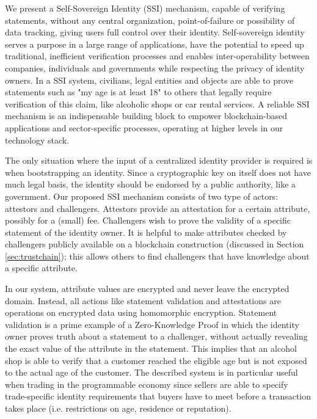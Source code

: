 \documentclass[USenglish]{article}
\begin{document}
We present a Self-Sovereign Identity (SSI) mechanism, capable of verifying statements, without any central organization, point-of-failure or possibility of data tracking, giving users full control over their identity.
Self-sovereign identity serves a purpose in a large range of applications, have the potential to speed up traditional, inefficient verification processes and enables inter-operability between companies, individuals and governments while respecting the privacy of identity owners.
In a SSI system, civilians, legal entities and objects are able to prove statements such as "my age is at least 18" to others that legally require verification of this claim, like alcoholic shops or car rental services.
A reliable SSI mechanism is an indispensable building block to empower blockchain-based applications and sector-specific processes, operating at higher levels in our technology stack.

The only situation where the input of a centralized identity provider is required is when bootstrapping an identity.
Since a cryptographic key on itself does not have much legal basis, the identity should be endorsed by a public authority, like a government.
Our proposed SSI mechanism consists of two type of actors: attestors and challengers.
Attestors provide an attestation for a certain attribute, possibly for a (small) fee.
Challengers wish to prove the validity of a specific statement of the identity owner.
It is helpful to make attributes checked by challengers publicly available on a blockchain construction (discussed in Section \ref{sec:trustchain}); this allows others to find challengers that have knowledge about a specific attribute.

In our system, attribute values are encrypted and never leave the encrypted domain.
Instead, all actions like statement validation and attestations are operations on encrypted data using homomorphic encryption.
Statement validation is a prime example of a Zero-Knowledge Proof in which the identity owner proves truth about a statement to a challenger, without actually revealing the exact value of the attribute in the statement.
This implies that an alcohol shop is able to verify that a customer reached the eligible age but is not exposed to the actual age of the customer.
The described system is in particular useful when trading in the programmable economy since sellers are able to specify trade-specific identity requirements that buyers have to meet before a transaction takes place (i.e. restrictions on age, residence or reputation).
\end{document}
